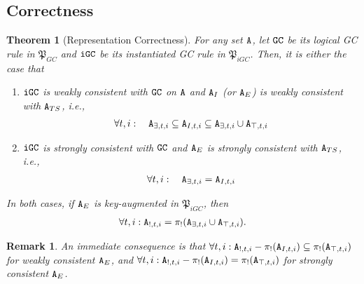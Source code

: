 \documentclass{article}
\numberwithin{equation}{section}
\newtheorem{thm}[theorem]{Theorem}
\newtheorem{rmk}{Remark}[section]
\renewcommand{\tt}[1]{\ifmmode\text{\texttt{#1}}\else\texttt{#1}\fi}
\begin{document}
\subsection{Correctness}
\begin{thm}[Representation Correctness]
\label{thm:instantiated_correctness}
For any set $\tt{A}$, let $\tt{GC}$ be its logical GC rule in $\mathfrak{P}_{GC}$ and $\tt{iGC}$ be its instantiated GC rule in $\mathfrak{P}_{iGC}$.
Then, it is either the case that
\begin{enumerate}
\item $\tt{iGC}$ is weakly consistent with $\tt{GC}$ on $\tt{A}$ and $\tt{A}_I$ (or $\tt{A}_E$) is weakly consistent with $\tt{A}_{TS}$, i.e.,
\begin{align}
\forall t, i: \quad \tt{A}_{\exists,t,i} \subseteq \tt{A}_{I,t,i} \subseteq \tt{A}_{\exists,t,i} \cup \tt{A}_{\top,t,i} \label{eq:thm_instantiated_correctness_set}
\end{align}
\item $\tt{iGC}$ is strongly consistent with $\tt{GC}$ and $\tt{A}_E$ is strongly consistent with $\tt{A}_{TS}$, i.e.,
\begin{align}
\forall t, i: \quad \tt{A}_{\exists,t,i} = \tt{A}_{I,t,i} \label{eq:thm_instantiated_correctness_set_strong}
\end{align}
\end{enumerate}
In both cases, if $\tt{A}_E$ is key-augmented in $\mathfrak{P}_{iGC}$, then
\begin{align}
\forall t, i : \tt{A}_{!,t,i} = \pi_!(\tt{A}_{\exists,t,i} \cup \tt{A}_{\top,t,i}) \label{eq:thm_instantiated_correctness_key}.
\end{align}
\end{thm}
\begin{rmk}
An immediate consequence is that $\forall t, i: \tt{A}_{!,t,i} - \pi_!(\tt{A}_{I,t,i}) \subseteq \pi_!(\tt{A}_{\top,t,i})$ for weakly consistent $\tt{A}_E$, and $\forall t, i: \tt{A}_{!,t,i} - \pi_!(\tt{A}_{I,t,i}) = \pi_!(\tt{A}_{\top,t,i})$ for strongly consistent $\tt{A}_E$.
\end{rmk}
\end{document}

